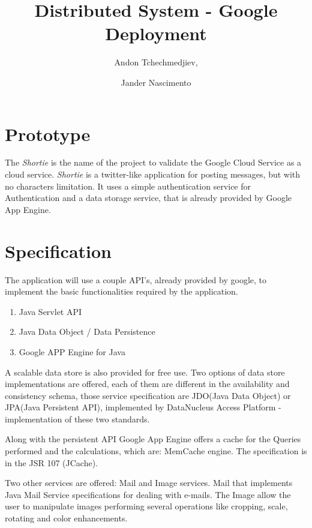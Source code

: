 \documentclass{article}
\begin{document}
\title{Distributed System - Google Deployment}

\author{Andon Tchechmedjiev, 
\and Jander Nascimento}

\maketitle

\section{Prototype}

The \emph{Shortie} is the name of the project to validate the Google Cloud Service as a cloud service.
\emph{Shortie} is a twitter-like application for posting messages, but with no characters limitation. It uses a simple authentication service for Authentication and a data storage service, that is already provided by Google App Engine.

\section{Specification}

The application will use a couple API's, already provided by google, to implement the basic functionalities required by the application. 

\begin{enumerate}
\item Java Servlet API
\item Java Data Object / Data Persistence	
\item Google APP Engine for Java
\end{enumerate}


A scalable data store is also provided for free use. Two options of data store implementations are offered, each of them are different in the availability and consistency schema, those service specification are JDO(Java Data Object) or JPA(Java Persistent API), implemented by DataNucleus Access Platform - implementation of these two standards.

Along with the persistent API Google App Engine offers a cache for the Queries performed and the calculations, which are: MemCache engine. The specification is in the JSR 107 (JCache).

Two other services are offered: Mail and Image services. Mail that implements Java Mail Service specifications for dealing with e-mails. The Image allow the user to manipulate images performing several operations like cropping, scale, rotating and color enhancements.
\end{document}
